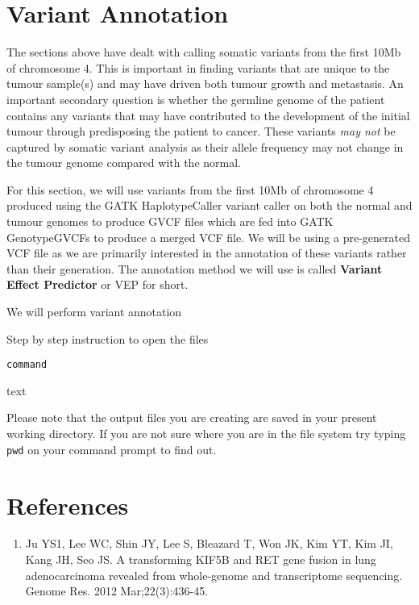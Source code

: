 \section{Variant Annotation}

The sections above have dealt with calling somatic variants from the first 10Mb of chromosome 4. This is important in finding variants that are unique to the tumour sample(s) and may have driven both tumour growth and metastasis. An important secondary question is whether the germline genome of the patient contains any variants that may have contributed to the development of the initial tumour through predisposing the patient to cancer. These variants \textit{may not} be captured by somatic variant analysis as their allele frequency may not change in the tumour genome compared with the normal.

For this section, we will use variants from the first 10Mb of chromosome 4 produced using the GATK HaplotypeCaller variant caller on both the normal and tumour genomes to produce GVCF files which are fed into GATK GenotypeGVCFs to produce a merged VCF file. We will be using a pre-generated VCF file as we are primarily interested in the annotation of these variants rather than their generation. The annotation method we will use is called \textbf{Variant Effect Predictor} or VEP for short.




We will perform variant annotation 

\begin{steps}
Step by step instruction to open the files 

\begin{lstlisting}
command
\end{lstlisting}
\end{steps}

text

\begin{note}
Please note that the output files you are creating are saved in your present working directory. If you are not sure where you are in the file system try typing \texttt{pwd} on your command prompt to find out.
\end{note}


\newpage


\section{References}

\begin{enumerate}
  \item Ju YS1, Lee WC, Shin JY, Lee S, Bleazard T, Won JK, Kim YT, Kim JI, Kang JH, Seo JS. A transforming KIF5B and RET gene fusion in lung adenocarcinoma revealed from whole-genome and transcriptome sequencing. Genome Res. 2012 Mar;22(3):436-45. 
\end{enumerate}

